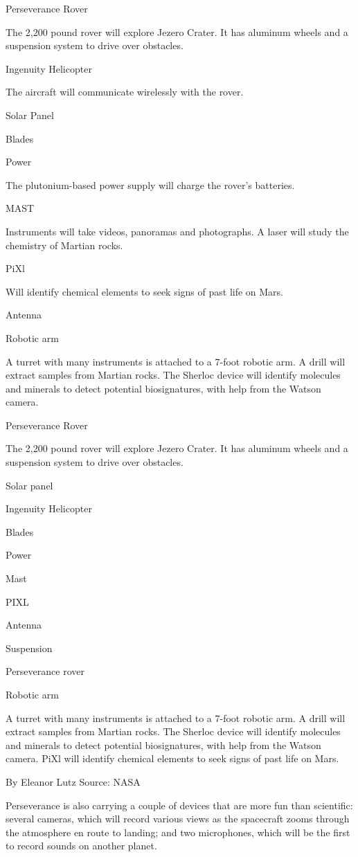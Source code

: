 Perseverance Rover

The 2,200 pound rover will explore Jezero Crater. It has aluminum wheels
and a suspension system to drive over obstacles.

Ingenuity Helicopter

The aircraft will communicate wirelessly with the rover.

Solar Panel

Blades

Power

The plutonium-based power supply will charge the rover's batteries.

MAST

Instruments will take videos, panoramas and photographs. A laser will
study the chemistry of Martian rocks.

PiXl

Will identify chemical elements to seek signs of past life on Mars.

Antenna

Robotic arm

A turret with many instruments is attached to a 7-foot robotic arm. A
drill will extract samples from Martian rocks. The Sherloc device will
identify molecules and minerals to detect potential biosignatures, with
help from the Watson camera.

Perseverance Rover

The 2,200 pound rover will explore Jezero Crater. It has aluminum wheels
and a suspension system to drive over obstacles.

Solar panel

Ingenuity Helicopter

Blades

Power

Mast

PIXL

Antenna

Suspension

Perseverance rover

Robotic arm

A turret with many instruments is attached to a 7-foot robotic arm. A
drill will extract samples from Martian rocks. The Sherloc device will
identify molecules and minerals to detect potential biosignatures, with
help from the Watson camera. PiXl will identify chemical elements to
seek signs of past life on Mars.

By Eleanor Lutz \textbar{} Source: NASA

Perseverance is also carrying a couple of devices that are more fun than
scientific: several cameras, which will record various views as the
spacecraft zooms through the atmosphere en route to landing; and two
microphones, which will be the first to record sounds on another planet.

